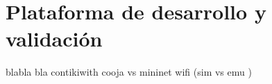 \section{Plataforma de desarrollo y validación}
\label{sec:ana_mininet_wifi}

blabla bla contikiwith cooja vs mininet wifi (sim vs emu )